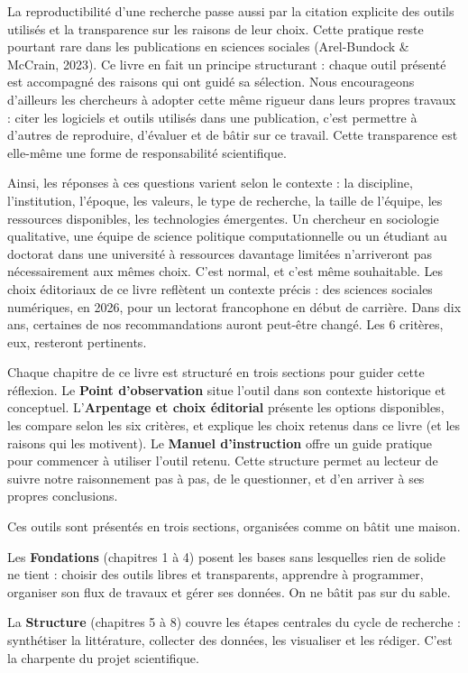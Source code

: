 \documentclass[
  letterpaper,
  DIV=11,
  numbers=noendperiod,
  oneside]{scrreprt}
\begin{document}
La reproductibilité d'une recherche passe aussi par la citation
explicite des outils utilisés et la transparence sur les raisons de leur
choix. Cette pratique reste pourtant rare dans les publications en
sciences sociales (Arel-Bundock \& McCrain, 2023). Ce livre en fait un
principe structurant : chaque outil présenté est accompagné des raisons
qui ont guidé sa sélection. Nous encourageons d'ailleurs les chercheurs
à adopter cette même rigueur dans leurs propres travaux : citer les
logiciels et outils utilisés dans une publication, c'est permettre à
d'autres de reproduire, d'évaluer et de bâtir sur ce travail. Cette
transparence est elle-même une forme de responsabilité scientifique.

Ainsi, les réponses à ces questions varient selon le contexte : la
discipline, l'institution, l'époque, les valeurs, le type de recherche,
la taille de l'équipe, les ressources disponibles, les technologies
émergentes. Un chercheur en sociologie qualitative, une équipe de
science politique computationnelle ou un étudiant au doctorat dans une
université à ressources davantage limitées n'arriveront pas
nécessairement aux mêmes choix. C'est normal, et c'est même souhaitable.
Les choix éditoriaux de ce livre reflètent un contexte précis : des
sciences sociales numériques, en 2026, pour un lectorat francophone en
début de carrière. Dans dix ans, certaines de nos recommandations auront
peut-être changé. Les 6 critères, eux, resteront pertinents.

Chaque chapitre de ce livre est structuré en trois sections pour guider
cette réflexion. Le \textbf{Point d'observation} situe l'outil dans son
contexte historique et conceptuel. L'\textbf{Arpentage et choix
éditorial} présente les options disponibles, les compare selon les six
critères, et explique les choix retenus dans ce livre (et les raisons
qui les motivent). Le \textbf{Manuel d'instruction} offre un guide
pratique pour commencer à utiliser l'outil retenu. Cette structure
permet au lecteur de suivre notre raisonnement pas à pas, de le
questionner, et d'en arriver à ses propres conclusions.

Ces outils sont présentés en trois sections, organisées comme on bâtit
une maison.

Les \textbf{Fondations} (chapitres 1 à 4) posent les bases sans
lesquelles rien de solide ne tient : choisir des outils libres et
transparents, apprendre à programmer, organiser son flux de travaux et
gérer ses données. On ne bâtit pas sur du sable.

La \textbf{Structure} (chapitres 5 à 8) couvre les étapes centrales du
cycle de recherche : synthétiser la littérature, collecter des données,
les visualiser et les rédiger. C'est la charpente du projet
scientifique.
\end{document}
